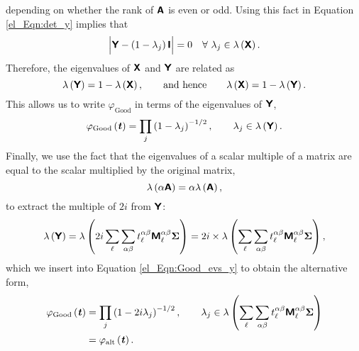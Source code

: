 depending on whether the rank of $\bm{\mathsf{A}}$ is even or odd. Using this fact in Equation \eqref{el_Eqn:det_y} implies that
\begin{equation}
    \Big\lvert
    \bm{\mathsf{Y}} - \left( 1 - \lambda_j \right) \bm{\mathsf{I}}
    \Big\rvert = 0 \quad
    \forall ~ \lambda_j \in \lambda \left( \bm{\mathsf{X}} \right).
\end{equation}
Therefore, the eigenvalues of $\bm{\mathsf{X}}$ and $\bm{\mathsf{Y}}$ are related as
\begin{equation}
\lambda \left( \bm{\mathsf{Y}} \right) = 1 - \lambda \left( \bm{\mathsf{X}} \right),
\quad \quad \text{and hence} \quad \quad
\lambda \left( \bm{\mathsf{X}} \right) = 1 - \lambda \left( \bm{\mathsf{Y}} \right).
\end{equation}
This allows us to write $\varphi_\mathrm{Good}$ in terms of the eigenvalues of $\bm{\mathsf{Y}}$,
\begin{equation}
\varphi_\mathrm{Good} \left( \bm{\mathit{t}} \right) =
\prod_j \left( 1 - \lambda_j \right)^{-1/2}, \quad \quad
\lambda_j \in \lambda \left( \bm{\mathsf{Y}} \right).
\label{el_Eqn:Good_evs_y}
\end{equation}
Finally, we use the fact that the eigenvalues of a scalar multiple of a matrix are equal to the scalar multiplied by the original matrix,
\begin{equation}
    \lambda \left( \alpha \bm{\mathsf{A}} \right) =
    \alpha \lambda \left( \bm{\mathsf{A}} \right),
\end{equation}
to extract the multiple of $2i$ from $\bm{\mathsf{Y}}$:
\begin{equation}
    \lambda \left( \bm{\mathsf{Y}} \right) =
    \lambda \left(
    2i \sum_\ell \sum_{\alpha \beta}
    t_\ell^{\alpha \beta} \bm{\mathsf{M}}_\ell^{\alpha \beta} \bm{\Sigma}
    \right)
    = 2i \times \lambda \left(
    \sum_\ell \sum_{\alpha \beta}
    t_\ell^{\alpha \beta} \bm{\mathsf{M}}_\ell^{\alpha \beta} \bm{\Sigma}
    \right),
\end{equation}
which we insert into Equation \eqref{el_Eqn:Good_evs_y} to obtain the alternative form,
\begin{equation}
\begin{split}
    \varphi_\mathrm{Good} \left( \bm{\mathit{t}} \right) &=
    \prod_j \left( 1 - 2i \lambda_j \right)^{-1/2}, \quad \quad
    \lambda_j \in \lambda \left( \sum_\ell \sum_{\alpha \beta}
    t_\ell^{\alpha \beta} \bm{\mathsf{M}}_\ell^{\alpha \beta} \bm{\Sigma} \right) \\
    &= \varphi_\mathrm{alt} \left( \bm{\mathit{t}} \right).
\end{split}
\end{equation}

